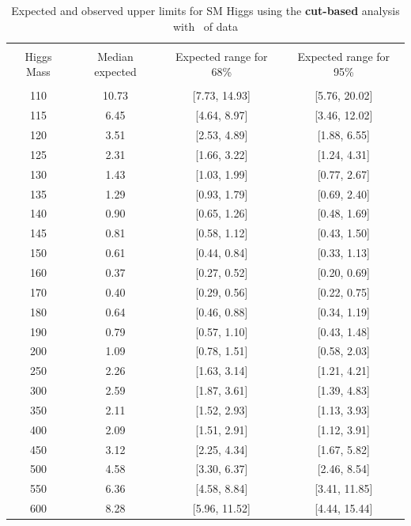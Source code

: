 \begin{table}[hbp!]
\begin{center}
\begin{tabular}{c c c c}
\hline
\vspace{-3mm} && \\
 Higgs Mass   & Median expected & Expected range for 68\% & Expected range for 95\%   \\
\vspace{-3mm} && \\
\hline
110 & 10.73 & [7.73, 14.93] & [5.76, 20.02] \\
115 &  6.45 & [4.64, 8.97] & [3.46, 12.02] \\ 
120 &  3.51 & [2.53, 4.89] & [1.88, 6.55] \\  
125 &  2.31 & [1.66, 3.22] & [1.24, 4.31] \\  
130 &  1.43 & [1.03, 1.99] & [0.77, 2.67] \\  
135 &  1.29 & [0.93, 1.79] & [0.69, 2.40] \\  
140 &  0.90 & [0.65, 1.26] & [0.48, 1.69] \\  
145 &  0.81 & [0.58, 1.12] & [0.43, 1.50] \\  
150 &  0.61 & [0.44, 0.84] & [0.33, 1.13] \\  
160 &  0.37 & [0.27, 0.52] & [0.20, 0.69] \\  
170 &  0.40 & [0.29, 0.56] & [0.22, 0.75] \\  
180 &  0.64 & [0.46, 0.88] & [0.34, 1.19] \\  
190 &  0.79 & [0.57, 1.10] & [0.43, 1.48] \\  
200 &  1.09 & [0.78, 1.51] & [0.58, 2.03] \\  
250 &  2.26 & [1.63, 3.14] & [1.21, 4.21] \\  
300 &  2.59 & [1.87, 3.61] & [1.39, 4.83] \\  
350 &  2.11 & [1.52, 2.93] & [1.13, 3.93] \\  
400 &  2.09 & [1.51, 2.91] & [1.12, 3.91] \\  
450 &  3.12 & [2.25, 4.34] & [1.67, 5.82] \\  
500 &  4.58 & [3.30, 6.37] & [2.46, 8.54] \\  
550 &  6.36 & [4.58, 8.84] & [3.41, 11.85] \\ 
600 &  8.28 & [5.96, 11.52] & [4.44, 15.44] \\
\hline
\end{tabular}
\caption{Expected and observed upper limits for SM Higgs using the
  {\bf cut-based} analysis with \intlumiEightTeV\ of data}
\label{tab:cutbase_uls}
\end{center}
\end{table}

